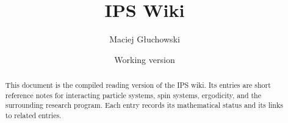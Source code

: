 \documentclass[11pt]{article}
\title{IPS Wiki}
\author{Maciej G\l{}uchowski}
\date{Working version}
\begin{document}
\maketitle

\begin{abstract}
This document is the compiled reading version of the IPS wiki. Its entries are short reference notes for interacting particle systems, spin systems, ergodicity, and the surrounding research program. Each entry records its mathematical status and its links to related entries.
\end{abstract}

\tableofcontents




\printbibliography
\end{document}
